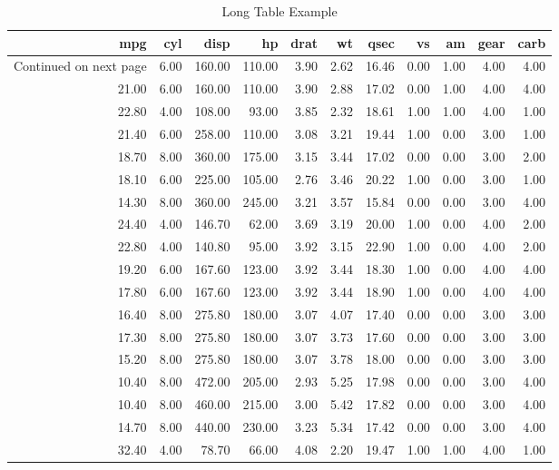 \documentclass[11pt,preprint, authoryear]{elsarticle}
\numberwithin{equation}{section}
\numberwithin{figure}{section}
\numberwithin{table}{section}
\begin{document}
\begingroup\fontsize{12pt}{13pt}\selectfont
\begin{longtable}{rrrrrrrrrrr}
\caption{Long Table Example} \\ 
  \toprule
mpg & cyl & disp & hp & drat & wt & qsec & vs & am & gear & carb \\ 
  \hline 
\endhead 
\hline 
{\footnotesize Continued on next page} 
\endfoot 
\endlastfoot 
 \midrule
21.00 & 6.00 & 160.00 & 110.00 & 3.90 & 2.62 & 16.46 & 0.00 & 1.00 & 4.00 & 4.00 \\ 
  21.00 & 6.00 & 160.00 & 110.00 & 3.90 & 2.88 & 17.02 & 0.00 & 1.00 & 4.00 & 4.00 \\ 
  22.80 & 4.00 & 108.00 & 93.00 & 3.85 & 2.32 & 18.61 & 1.00 & 1.00 & 4.00 & 1.00 \\ 
  21.40 & 6.00 & 258.00 & 110.00 & 3.08 & 3.21 & 19.44 & 1.00 & 0.00 & 3.00 & 1.00 \\ 
  18.70 & 8.00 & 360.00 & 175.00 & 3.15 & 3.44 & 17.02 & 0.00 & 0.00 & 3.00 & 2.00 \\ 
  18.10 & 6.00 & 225.00 & 105.00 & 2.76 & 3.46 & 20.22 & 1.00 & 0.00 & 3.00 & 1.00 \\ 
  14.30 & 8.00 & 360.00 & 245.00 & 3.21 & 3.57 & 15.84 & 0.00 & 0.00 & 3.00 & 4.00 \\ 
  24.40 & 4.00 & 146.70 & 62.00 & 3.69 & 3.19 & 20.00 & 1.00 & 0.00 & 4.00 & 2.00 \\ 
  22.80 & 4.00 & 140.80 & 95.00 & 3.92 & 3.15 & 22.90 & 1.00 & 0.00 & 4.00 & 2.00 \\ 
  19.20 & 6.00 & 167.60 & 123.00 & 3.92 & 3.44 & 18.30 & 1.00 & 0.00 & 4.00 & 4.00 \\ 
  17.80 & 6.00 & 167.60 & 123.00 & 3.92 & 3.44 & 18.90 & 1.00 & 0.00 & 4.00 & 4.00 \\ 
  16.40 & 8.00 & 275.80 & 180.00 & 3.07 & 4.07 & 17.40 & 0.00 & 0.00 & 3.00 & 3.00 \\ 
  17.30 & 8.00 & 275.80 & 180.00 & 3.07 & 3.73 & 17.60 & 0.00 & 0.00 & 3.00 & 3.00 \\ 
  15.20 & 8.00 & 275.80 & 180.00 & 3.07 & 3.78 & 18.00 & 0.00 & 0.00 & 3.00 & 3.00 \\ 
  10.40 & 8.00 & 472.00 & 205.00 & 2.93 & 5.25 & 17.98 & 0.00 & 0.00 & 3.00 & 4.00 \\ 
  10.40 & 8.00 & 460.00 & 215.00 & 3.00 & 5.42 & 17.82 & 0.00 & 0.00 & 3.00 & 4.00 \\ 
  14.70 & 8.00 & 440.00 & 230.00 & 3.23 & 5.34 & 17.42 & 0.00 & 0.00 & 3.00 & 4.00 \\ 
  32.40 & 4.00 & 78.70 & 66.00 & 4.08 & 2.20 & 19.47 & 1.00 & 1.00 & 4.00 & 1.00 \\ 

\end{longtable}
\end{document}
